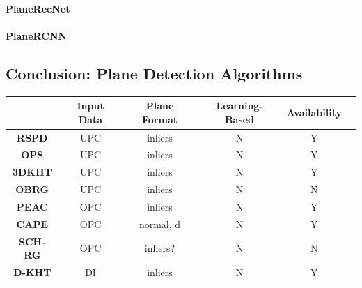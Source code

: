 \documentclass[main.tex]{subfiles}
\begin{document}
\paragraph{PlaneRecNet}
\paragraph{PlaneRCNN}

\subsection{Conclusion: Plane Detection Algorithms}
\begin{table}[H]
    \centering
    \begin{tabular}{|c|c|c|c|c|c}
        \hline
                                                                         & \textbf{Input Data} & \textbf{Plane Format} & \textbf{Learning-Based} & \textbf{Availability} \\ \hline
        \textbf{RSPD} \cite{Araújo_Oliveira_2020}                        & UPC                 & inliers               & N                       & Y                     \\ \hline
        \textbf{OPS} \cite{Sun_Mordohai_2019}                            & UPC                 & inliers               & N                       & Y                     \\ \hline
        \textbf{3DKHT} \cite{Limberger_Oliveira_2015}                    & UPC                 & inliers               & N                       & Y                     \\ \hline
        \textbf{OBRG} \cite{Vo_Truong-Hong_Laefer_Bertolotto_2015}       & UPC                 & inliers               & N                       & N                     \\ \hline
        \textbf{PEAC} \cite{Feng_Taguchi_Kamat_2014}                     & OPC                 & inliers               & N                       & Y                     \\ \hline
        \textbf{CAPE} \cite{Proença_Gao_2018}                            & OPC                 & normal, d             & N                       & Y                     \\ \hline
        \textbf{SCH-RG} \cite{Mols_Li_Hanebeck_2020}                     & OPC                 & inliers?              & N                       & N                     \\ \hline
        \textbf{D-KHT}  \cite{Vera_Lucio_Fernandes_Velho_2018}           & DI                  & inliers               & N                       & Y                     \\ \hline

\end{tabular}
\end{table}
\end{document}
